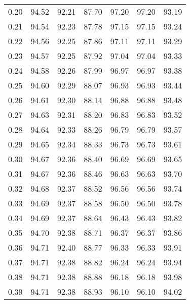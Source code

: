 \begin{tabular}{|c|c|c|c|c|c|c|}
      0.20 &     94.52 &     92.21 &      87.70 &   97.20 &      97.20 &         93.19 \\
      0.21 &     94.54 &     92.23 &      87.78 &   97.15 &      97.15 &         93.24 \\
      0.22 &     94.56 &     92.25 &      87.86 &   97.11 &      97.11 &         93.29 \\
      0.23 &     94.57 &     92.25 &      87.92 &   97.04 &      97.04 &         93.33 \\
      0.24 &     94.58 &     92.26 &      87.99 &   96.97 &      96.97 &         93.38 \\
      0.25 &     94.60 &     92.29 &      88.07 &   96.93 &      96.93 &         93.44 \\
      0.26 &     94.61 &     92.30 &      88.14 &   96.88 &      96.88 &         93.48 \\
      0.27 &     94.63 &     92.31 &      88.20 &   96.83 &      96.83 &         93.52 \\
      0.28 &     94.64 &     92.33 &      88.26 &   96.79 &      96.79 &         93.57 \\
      0.29 &     94.65 &     92.34 &      88.33 &   96.73 &      96.73 &         93.61 \\
      0.30 &     94.67 &     92.36 &      88.40 &   96.69 &      96.69 &         93.65 \\
      0.31 &     94.67 &     92.36 &      88.46 &   96.63 &      96.63 &         93.70 \\
      0.32 &     94.68 &     92.37 &      88.52 &   96.56 &      96.56 &         93.74 \\
      0.33 &     94.69 &     92.37 &      88.58 &   96.50 &      96.50 &         93.78 \\
      0.34 &     94.69 &     92.37 &      88.64 &   96.43 &      96.43 &         93.82 \\
      0.35 &     94.70 &     92.38 &      88.71 &   96.37 &      96.37 &         93.86 \\
      0.36 &     94.71 &     92.40 &      88.77 &   96.33 &      96.33 &         93.91 \\
      0.37 &     94.71 &     92.38 &      88.82 &   96.24 &      96.24 &         93.94 \\
      0.38 &     94.71 &     92.38 &      88.88 &   96.18 &      96.18 &         93.98 \\
      0.39 &     94.71 &     92.38 &      88.93 &   96.10 &      96.10 &         94.02 \\

\end{tabular}
